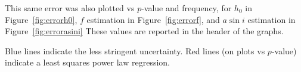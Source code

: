 This same error was also plotted vs $p$-value and frequency, for $h_0$ in Figure~\ref{fig:errorh0}, $f$ estimation in Figure~\ref{fig:errorf}, and $a \sin i$ estimation in Figure~\ref{fig:errorasini} 
These values are reported in the header of the graphs.

Blue lines indicate the less stringent uncertainty. Red lines (on plots vs $p$-value) indicate a least squares power law regression.

